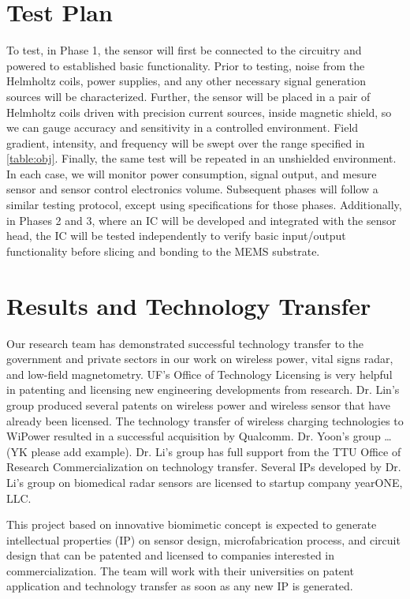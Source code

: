 \section{Test Plan}\label{sec:test}

To test, in Phase 1, the sensor will first be connected to the circuitry and powered to established basic functionality.  Prior to testing, noise from the Helmholtz coils, power supplies, and any other necessary signal generation sources will be characterized. Further, the sensor will be placed in a pair of Helmholtz coils driven with precision current sources, inside magnetic shield, so we can gauge accuracy and sensitivity in a controlled environment. Field gradient, intensity, and frequency will be swept over the range specified in \ref{table:obj}. Finally, the same test will be repeated in an unshielded environment. In each case, we will monitor power consumption, signal output, and mesure sensor and sensor control electronics volume. Subsequent phases will follow a similar testing protocol, except using specifications for those phases. Additionally, in Phases 2 and 3, where an IC will be developed and integrated with the sensor head, the IC will be tested independently to verify basic input/output functionality before slicing and bonding to the MEMS substrate.

\section{Results and Technology Transfer}

Our research team has demonstrated successful technology transfer to the government and private sectors in our work on wireless power, vital signs radar, and low-field magnetometry. UF's Office of Technology Licensing is very helpful in patenting and licensing new engineering developments from research. Dr. Lin's group produced several patents on wireless power and wireless sensor that have already been licensed. The technology transfer of wireless charging technologies to WiPower resulted in a successful acquisition by Qualcomm. Dr. Yoon's group … (YK please add example). Dr. Li’s group has full support from the TTU Office of Research Commercialization on technology transfer. Several IPs developed by Dr. Li’s group on biomedical radar sensors are licensed to startup company yearONE, LLC.

This project based on innovative biomimetic concept is expected to generate intellectual properties (IP) on sensor design, microfabrication process, and circuit design that can be patented and licensed to companies interested in commercialization. The team will work with their universities on patent application and technology transfer as soon as any new IP is generated. 


